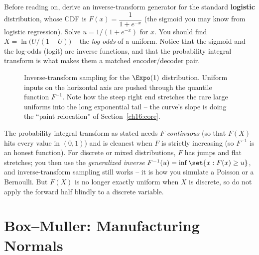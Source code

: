 \begin{labbox}
Before reading on, derive an inverse-transform generator for the standard \textbf{logistic}
distribution, whose CDF is $F(x) = \dfrac{1}{1+e^{-x}}$ (the sigmoid you may know from
logistic regression). Solve $u = 1/(1+e^{-x})$ for $x$. You should find
$X = \ln\!\big(U/(1-U)\big)$ -- the \emph{log-odds} of a uniform. Notice that the sigmoid
and the log-odds (logit) are inverse functions, and that the probability integral
transform is what makes them a matched encoder/decoder pair.
\end{labbox}

\begin{figure}[H]
\centering
{}
\caption{Inverse-transform sampling for the $\Expo(1)$ distribution. Uniform inputs on the
horizontal axis are pushed through the quantile function $F^{-1}$. Note how the steep right
end stretches the rare large uniforms into the long exponential tail -- the curve's slope
is doing the ``paint relocation'' of Section~\ref{ch16:core}.}
\label{ch16:fig-pit}
\end{figure}

\begin{trapbox}
The probability integral transform as stated needs $F$ \emph{continuous} (so that $F(X)$
hits every value in $(0,1)$) and is cleanest when $F$ is strictly increasing (so $F^{-1}$
is an honest function). For discrete or mixed distributions, $F$ has jumps and flat
stretches; you then use the \emph{generalized inverse}
$F^{-1}(u) = \inf\set{x : F(x) \ge u}$, and inverse-transform sampling still works -- it is
how you simulate a Poisson or a Bernoulli. But $F(X)$ is no longer exactly uniform when $X$
is discrete, so do not apply the forward half blindly to a discrete variable.
\end{trapbox}

\section{Box--Muller: Manufacturing Normals}
\label{ch16:box-muller}


